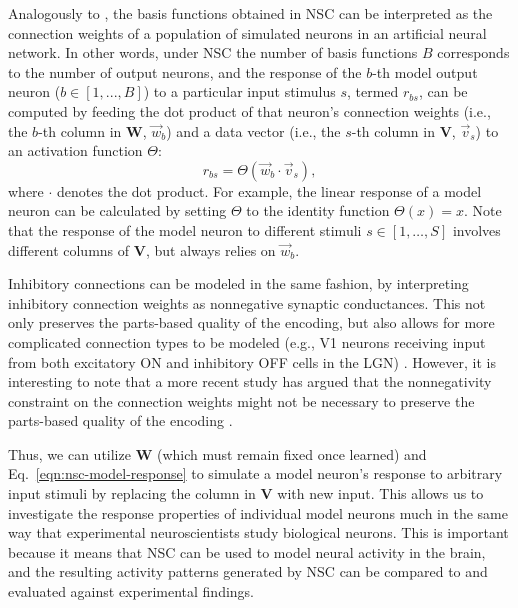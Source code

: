 Analogously to \cite{OlshausenField1996,OlshausenField1997},
the basis functions obtained in \ac{NSC} can be interpreted as
the connection weights of a population of simulated neurons
in an artificial neural network.
In other words, under \ac{NSC} the number of basis functions $B$ 
corresponds to the number of output neurons, and the
response of the $b$-th model output neuron
($b \in [1, ..., B]$)
to a particular input stimulus $s$, termed $r_{bs}$,
can be computed by feeding the dot product of
that neuron's connection weights
(i.e., the $b$-th column in $\mathbf{W}$, $\vec{w}_b$)
and a data vector
(i.e., the $s$-th column in \textbf{V}, $\vec{v}_s$)
to an activation function $\Theta$:
\begin{equation}
r_{bs} = \Theta(\vec{w}_b \cdot \vec{v}_s),
\label{eqn:nsc-model-response}
\end{equation}
where $\cdot$ denotes the dot product.
For example, the linear response of a model neuron
can be calculated by setting $\Theta$ to the identity function $\Theta(x)=x$.
Note that the response of the model neuron to different stimuli 
$s \in [1, \ldots, S]$
involves different columns of \textbf{V},
but always relies on $\vec{w}_b$.

Inhibitory connections can be modeled in the same fashion,
by interpreting inhibitory connection weights
as nonnegative synaptic conductances.
This not only preserves the parts-based quality of the encoding,
but also allows for more complicated connection types to be modeled
(e.g., \ac{V1} neurons receiving input from both excitatory ON
and inhibitory OFF cells in the \ac{LGN}) \cite{Hoyer2003}.
However, it is interesting to note that a more recent study has argued
that the nonnegativity constraint on the
connection weights might not be necessary 
to preserve the parts-based quality of the encoding \cite{Liu2017}.


Thus, we can utilize \textbf{W} 
(which must remain fixed once learned)
and Eq.~\ref{eqn:nsc-model-response}
to simulate a model neuron's response to arbitrary input stimuli
by replacing the column in \textbf{V} with new input.
This allows us to investigate the response properties 
of individual model neurons
much in the same way that experimental neuroscientists 
study biological neurons.
This is important because it means that \ac{NSC} can be used to 
model neural activity in the brain, 
and the resulting activity patterns generated by \ac{NSC}
can be compared to and evaluated against experimental findings. 

